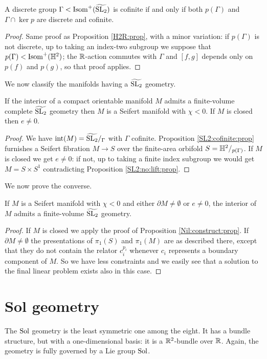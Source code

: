 \begin{prop} \label{SL2:cofinite:prop}
A discrete group $\Gamma < {\rm Isom}^+(\widetilde{{\rm SL}_2})$ is cofinite if and only if both $p(\Gamma)$ and $\Gamma \cap \ker p$ are discrete and cofinite.
\end{prop}
\begin{proof}
Same proof as Proposition \ref{H2R:prop}, with a minor variation: if $p(\Gamma)$ is not discrete, up to taking an index-two subgroup we suppose that $p(\Gamma) <  {\rm Isom}^+(\mathbb{H}^2)$; the $\mathbb{R}$-action commutes with $\Gamma$ and $[f,g]$ depends only on $p(f)$ and $p(g)$, so that proof applies.
\end{proof}

We now classify the manifolds having a $\widetilde{{\rm SL}_2}$ geometry.

\begin{cor}
If the interior of a compact orientable manifold $M$ admits a finite-volume complete $\widetilde{{\rm SL}_2}$ geometry then $M$ is a Seifert manifold with $\chi<0$. If $M$ is closed then $e\neq 0$.
\end{cor}
\begin{proof}
We have ${\rm int}(M)= \widetilde{{\rm SL}_2}/_\Gamma$ with $\Gamma$ cofinite. Proposition \ref{SL2:cofinite:prop} furnishes a Seifert fibration $M\to S$ over the finite-area orbifold $S=\mathbb{H}^2/_{p(\Gamma)}$. If $M$ is closed we get $e\neq 0$: if not, up to taking a finite index subgroup we would get $M=S\times S^1$ contradicting Proposition \ref{SL2:no:lift:prop}.
\end{proof}

We now prove the converse.

\begin{prop}
If $M$ is a Seifert manifold with $\chi<0$ and either $\partial M\neq \emptyset$ or $e\neq 0$, the interior of $M$ admits a finite-volume $\widetilde{{\rm SL}_2}$ geometry.
\end{prop}
\begin{proof}
If $M$ is closed we apply the proof of Proposition \ref{Nil:construct:prop}. If $\partial M \neq \emptyset$ the presentations of $\pi_1(S)$ and $\pi_1(M)$ are as described there, except that they do not contain the relator $c_i^{p_i}$ whenever $c_i$ represents a boundary component of $M$. So we have less constraints and we easily see that a solution to the final linear problem exists also in this case. 
\end{proof}

\section{Sol geometry}
The ${\rm Sol}$ geometry is the least symmetric one among the eight. It has a bundle structure, but with a one-dimensional basis: it is a $\mathbb{R}^2$-bundle over $\mathbb{R}$. Again, the geometry is fully governed by a Lie group ${\rm Sol}$.

